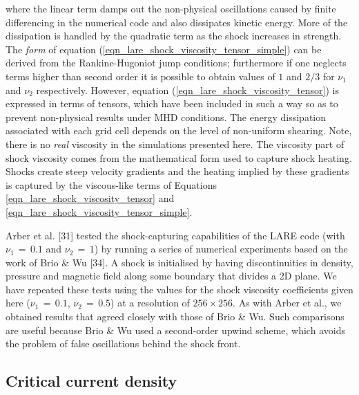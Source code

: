 \documentclass{./packages/rs/rsproca}
\begin{document}
where the linear term damps out the non-physical oscillations caused by finite differencing in the numerical code and also dissipates kinetic energy. More of the dissipation is handled by the quadratic term as the shock increases in strength. The \textit{form} of equation (\ref{eqn_lare_shock_viscosity_tensor_simple}) can be derived from the Rankine-Hugoniot jump conditions; furthermore if one neglects terms higher than second order it is possible to obtain values of $1$ and $2/3$ for $\nu_1$ and $\nu_2$ respectively. However, equation (\ref{eqn_lare_shock_viscosity_tensor}) is expressed in terms of tensors, which have been included in such a way so as to prevent non-physical results under MHD conditions. The energy dissipation associated with each grid cell depends on the level of non-uniform shearing. Note, there is no \textit{real} viscosity in the simulations presented here. The viscosity part of shock viscosity comes from the mathematical form used to capture shock heating. Shocks create steep velocity gradients and the heating implied by these gradients is captured by the viscous-like terms of Equations \ref{eqn_lare_shock_viscosity_tensor} and \ref{eqn_lare_shock_viscosity_tensor_simple}.

Arber et al. [31] tested the shock-capturing capabilities of the LARE code (with $\nu_1\,{=}\,0.1$ and $\nu_2\,{=}\,1$) by running a series of numerical experiments based on the work of Brio \& Wu [34]. A shock is initialised by having discontinuities in density, pressure and magnetic field along some boundary that divides a 2D plane. We have repeated these tests using the values for the shock viscosity coefficients given here ($\nu_1\,{=}\,0.1$, $\nu_2\,{=}\,0.5$) at a resolution of $256\times256$. As with Arber et al., we obtained results that agreed closely with those of Brio \& Wu. Such comparisons are useful because Brio \& Wu used a second-order upwind scheme, which avoids the problem of false oscillations behind the shock front.

\subsection{Critical current density}
\label{sec_NumericalCode_CriticalCurrentDensity}
\end{document}
